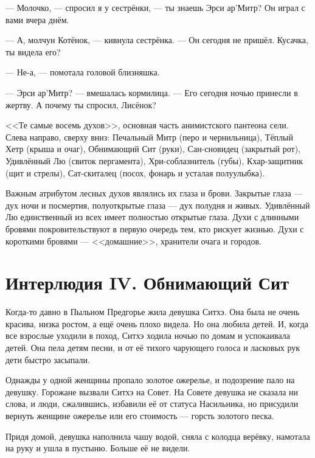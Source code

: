 --- Молочко, --- спросил я у сестрёнки, --- ты знаешь Эрси ар’Митр?
Он играл с вами вчера днём.

--- А, молчун Котёнок, --- кивнула сестрёнка.
--- Он сегодня не пришёл.
Кусачка, ты видела его?

--- Не-а, --- помотала головой близняшка.

--- Эрси ар’Митр? --- вмешалась кормилица.
--- Его сегодня ночью принесли в жертву.
А почему ты спросил, Лисёнок?


\newpage
\thispagestyle{plain}

<<Те самые восемь духов>>, основная часть анимистского пантеона сели.
Слева направо, сверху вниз: Печальный Митр (перо и чернильница), Тёплый Хетр (крыша и очаг), Обнимающий Сит (руки), Сан-сновидец (закрытый рот), Удивлённый Лю (свиток пергамента), Хри-соблазнитель (губы), Кхар-защитник (щит и стрелы), Сат-скиталец (посох, фонарь и усталая полуулыбка).

Важным атрибутом лесных духов являлись их глаза и брови.
Закрытые глаза --- дух ночи и посмертия, полуоткрытые глаза --- дух полудня и живых.
Удивлённый Лю единственный из всех имеет полностью открытые глаза.
Духи с длинными бровями покровительствуют в первую очередь тем, кто рискует жизнью.
Духи с короткими бровями --- <<домашние>>, хранители очага и городов.
\newpage

\chapter*{Интерлюдия IV. Обнимающий Сит}

Когда-то давно в Пыльном Предгорье жила девушка Ситхэ.
Она была не очень красива, низка ростом, а ещё очень плохо видела.
Но она любила детей.
И, когда все взрослые уходили в поход, Ситхэ ходила ночью по домам и успокаивала детей.
Она пела детям песни, и от её тихого чарующего голоса и ласковых рук дети быстро засыпали.

Однажды у одной женщины пропало золотое ожерелье, и подозрение пало на девушку.
Горожане вызвали Ситхэ на Совет.
На Совете девушка не сказала ни слова, и люди, сжалившись, избавили её от статуса Насильника, но присудили вернуть женщине ожерелье или его стоимость --- горсть золотого песка.

Придя домой, девушка наполнила чашу водой, сняла с колодца верёвку, намотала на руку и ушла в пустыню.
Больше её не видели.

